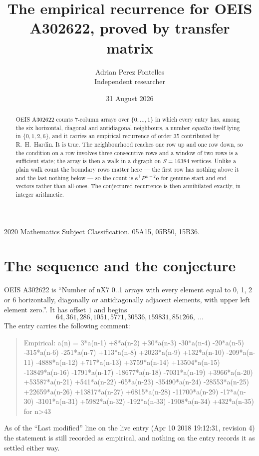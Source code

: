 \documentclass[11pt,a4paper]{article}
\title{The empirical recurrence for OEIS A302622, proved by transfer matrix}
\author{Adrian Perez Fontelles\\ \small Independent researcher}
\date{31 August 2026}
\theoremstyle{plain}
\theoremstyle{definition}
\begin{document}
\maketitle

\begin{abstract}
OEIS A302622 counts $7$-column arrays over $\{0,\dots,1\}$ in which every entry has,
among the six horizontal, diagonal and antidiagonal neighbours, a number $equal to$ itself lying in $\{0,1,2,6\}$, and it carries an empirical
recurrence of order $35$ contributed by R.~H.~Hardin. It is true. The neighbourhood
reaches one row up and one row down, so the condition on a row involves three consecutive
rows and a window of two rows is a sufficient state; the array is then a walk in a digraph
on $S=16384$ vertices. Unlike a plain walk count the boundary rows matter here --- the first
row has nothing above it and the last nothing below --- so the count is
$\mathbf{s}^{\!\top}P^{\,n-2}\mathbf{e}$ for genuine start and end vectors rather than
all-ones. The conjectured recurrence is then annihilated exactly, in integer arithmetic.
\end{abstract}

\noindent\small 2020 Mathematics Subject Classification. 05A15, 05B50, 15B36.\normalsize

\section{The sequence and the conjecture}

OEIS A302622 is ``Number of nX7 0..1 arrays with every element equal to 0, 1, 2 or 6 horizontally, diagonally or antidiagonally adjacent elements, with upper left element zero.''. It has offset
$1$ and begins
\[
64, 361, 286, 1051, 5771, 30536, 159831, 851266,\ \dots
\]
The entry carries the following comment:
\begin{quote}\small
Empirical: a(n) = 3*a(n-1) +8*a(n-2) +30*a(n-3) -30*a(n-4) -20*a(n-5) -315*a(n-6) -251*a(n-7) +113*a(n-8) +2023*a(n-9) +132*a(n-10) -209*a(n-11) -4888*a(n-12) +717*a(n-13) +3759*a(n-14) +13504*a(n-15) -13849*a(n-16) -1791*a(n-17) -18677*a(n-18) -7031*a(n-19) +3966*a(n-20) +53587*a(n-21) +541*a(n-22) -65*a(n-23) -35490*a(n-24) -28553*a(n-25) +22659*a(n-26) +13817*a(n-27) +6815*a(n-28) -11700*a(n-29) -17*a(n-30) -3101*a(n-31) +5982*a(n-32) -192*a(n-33) -1908*a(n-34) +432*a(n-35) for n>43
\end{quote}
As of the ``Last modified'' line on the live entry (Apr 10 2018 19:12:31, revision
4) the statement is still recorded as empirical, and nothing on the entry
records it as settled either way.
\end{document}
